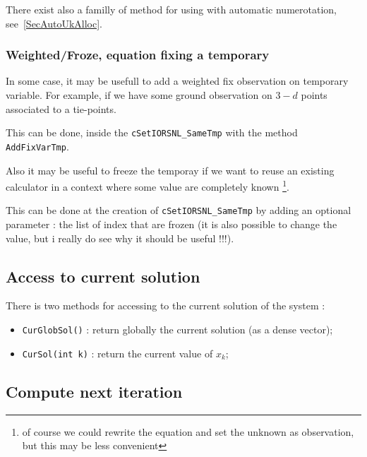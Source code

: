 There exist also a familly of method for using with automatic numerotation, see~\ref{SecAutoUkAlloc}.



\subsubsection{Weighted/Froze, equation fixing a temporary}

\label{FrozeSetIORSNL}

In some case, it may be usefull to add a weighted fix observation  on temporary variable.
For example, if we have some ground observation on $3-d$ points associated to a tie-points.

This can be done, inside the {\tt cSetIORSNL\_SameTmp} with the method {\tt AddFixVarTmp}.

Also it may be useful to freeze the temporay if we want to reuse an existing calculator
in a context where some value are completely known \footnote{of course we could rewrite the
equation and set the unknown as observation, but this may be less convenient}.

This can be done at the creation of {\tt cSetIORSNL\_SameTmp} by adding an optional parameter :
the list of index that are frozen (it is also possible to change the value, but i really do see
why it should be useful !!!).


\subsection{Access to current solution}

There is two methods for accessing to the current solution of the system :

\begin{itemize}
       \item {\tt CurGlobSol()} : return globally the current solution (as a dense vector);

       \item {\tt CurSol(int k)} : return  the current value of $x_k$;

\end{itemize}


\subsection{Compute next iteration}


